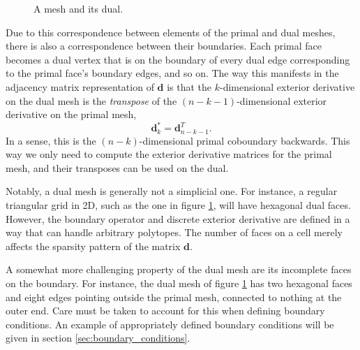 \documentclass[utf8,english]{gradu3}
\begin{document}
\begin{figure}[h]
  \centering
  \caption{A mesh and its dual.}
  \label{fig:dual_mesh}
\end{figure}

Due to this correspondence between elements of the primal and dual meshes,
there is also a correspondence between their boundaries.
Each primal face becomes a dual vertex that is on the boundary
of every dual edge corresponding to the primal face's boundary edges, and so on.
The way this manifests in the adjacency matrix representation of $\mathbf{d}$
is that the $k$-dimensional exterior derivative
on the dual mesh is the \textit{transpose} of the $(n-k-1)$-dimensional
exterior derivative on the primal mesh,
\[
  \mathbf{d}^*_k = \mathbf{d}_{n-k-1}^T.
\]
In a sense, this is the $(n-k)$-dimensional primal coboundary backwards.
This way we only need to compute the exterior derivative matrices
for the primal mesh, and their transposes can be used on the dual.

Notably, a dual mesh is generally not a simplicial one.
For instance, a regular triangular grid in 2D,
such as the one in figure \ref{fig:dual_mesh}, will have hexagonal dual faces.
However, the boundary operator and discrete exterior derivative
are defined in a way that can handle arbitrary polytopes.
The number of faces on a cell merely affects the sparsity pattern
of the matrix $\mathbf{d}$.

A somewhat more challenging property of the dual mesh
are its incomplete faces on the boundary.
For instance, the dual mesh of figure \ref{fig:dual_mesh} has two hexagonal faces
and eight edges pointing outside the primal mesh, connected to nothing at the outer end.
Care must be taken to account for this when defining boundary conditions.
An example of appropriately defined boundary conditions
will be given in section \ref{sec:boundary_conditions}.
\end{document}
